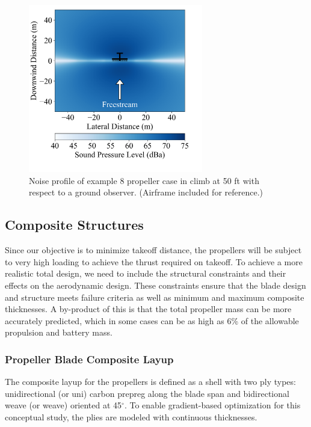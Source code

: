 \documentclass[conf]{new-aiaa}
\begin{document}
\begin{figure}[h!]
    \centering
    \includegraphics[trim={0cm 1cm 0cm 0cm},clip,width=3.0in]{noise_contour.png}
    \caption{Noise profile of example 8 propeller case in climb at 50 ft with respect to a ground observer. (Airframe included for reference.)}
    \label{fig:noise_contour}
\end{figure}

\subsection{Composite Structures}


Since our objective is to minimize takeoff distance, the propellers will be subject to very high loading to achieve the thrust required on takeoff. To achieve a more realistic total design, we need to include the structural constraints and their effects on the aerodynamic design. These constraints ensure that the blade design and structure meets failure criteria as well as minimum and maximum composite thicknesses. A by-product of this is that the total propeller mass can be more accurately predicted, which in some cases can be as high as 6\% of the allowable propulsion and battery mass.

\subsubsection{Propeller Blade Composite Layup}

The composite layup for the propellers is defined as a shell with two ply types: unidirectional (or uni) carbon prepreg along the blade span and bidirectional weave (or weave) oriented at 45$^{\circ}$. To enable gradient-based optimization for this conceptual study, the plies are modeled with continuous thicknesses.
\end{document}
